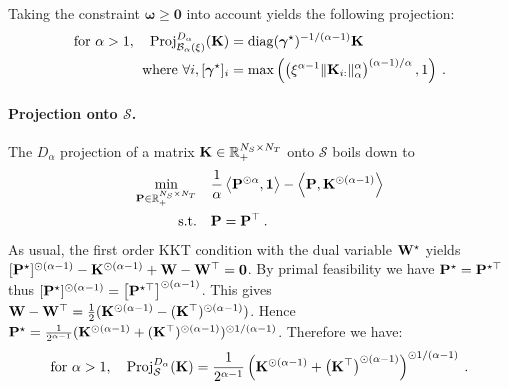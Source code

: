     Taking the constraint $\bm{\omega} \bm{\geq} \bm{0}$ into account yields the following projection:
    \begin{align}
        \text{for } \alpha>1, \quad  \operatorname{Proj}^{D_\alpha}_{\mathcal{B}_\alpha(\xi)}({\mathbf{K}}) &= \operatorname{diag}(\bm{\gamma}^\star)^{-1/(\alpha-1)}\mathbf{K} \\ \text{where } \forall i, [\bm{\gamma}^\star]_i &= \max \left(\left(\xi^{\alpha-1} \|{\mathbf{K}}_{i:}\|_\alpha^\alpha \right)^{(\alpha-1) / \alpha}, 1 \right)
         \:.
    \end{align}
        
    \paragraph{Projection onto $\mathcal{S}$.} The $D_\alpha$ projection of a matrix ${\mathbf{K}} \in \mathbb{R}_+^{N_S \times N_T}$ onto $\mathcal{S}$ boils down to
    \begin{align}
        \min_{{\mathbf{P}} \in \mathbb{R}_+^{N_S \times N_T}} \quad &\frac{1}{\alpha}\left\langle {\mathbf{P}}^{\odot \alpha}, \bm{1} \right\rangle - \left\langle {\mathbf{P}}, {\mathbf{K}}^{\odot (\alpha-1)} \right\rangle \\
        \text{s.t.} \quad
        &{\mathbf{P}} = {\mathbf{P}}^\top \:.
    \end{align}
    As usual, the first order KKT condition with the dual variable ${\mathbf{W}}^\star$ yields $[{\mathbf{P}}^\star]^{\odot (\alpha - 1)} - {\mathbf{K}}^{\odot(\alpha-1)} + {\mathbf{W}} - {\mathbf{W}}^\top = \bm{0}$.
    By primal feasibility we have ${\mathbf{P}}^\star = {\mathbf{P}}^{\star \top}$ thus $[{\mathbf{P}}^\star]^{\odot (\alpha - 1)} = \left[{\mathbf{P}}^{\star \top}\right]^{\odot (\alpha - 1)}$. This gives ${\mathbf{W}} - {\mathbf{W}}^\top = \frac{1}{2} ({\mathbf{K}}^{\odot (\alpha-1)} -  ({\mathbf{K}}^{\top})^{\odot (\alpha-1)})$. Hence ${\mathbf{P}}^\star = \frac{1}{2^{\alpha-1}} ({\mathbf{K}}^{\odot (\alpha-1)} +  ({\mathbf{K}}^{\top})^{\odot (\alpha-1)})^{\odot 1/(\alpha-1)}$. Therefore we have:
    \begin{align}
        \text{for } \alpha>1, \quad 
        \operatorname{Proj}^{D_\alpha}_{\mathcal{S}}(\mathbf{K}) = \frac{1}{2^{\alpha-1}} \left({\mathbf{K}}^{\odot (\alpha-1)} +  \left({\mathbf{K}}^{\top}\right)^{\odot (\alpha-1)}\right)^{\odot 1/(\alpha-1)}
        \:.
    \end{align}



